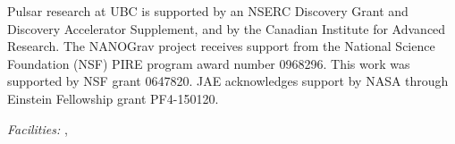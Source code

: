 \documentclass[12pt,preprint]{aastex}
\begin{document}





\acknowledgements
Pulsar research at UBC is supported by an NSERC Discovery Grant and Discovery
Accelerator Supplement, and by the Canadian Institute for Advanced Research.
The NANOGrav project receives support from the National Science Foundation
(NSF) PIRE program award number 0968296. This work was supported by NSF grant 0647820.
JAE acknowledges support by NASA through Einstein Fellowship grant PF4-150120.


{\it Facilities:}
, 

%



\end{document}
